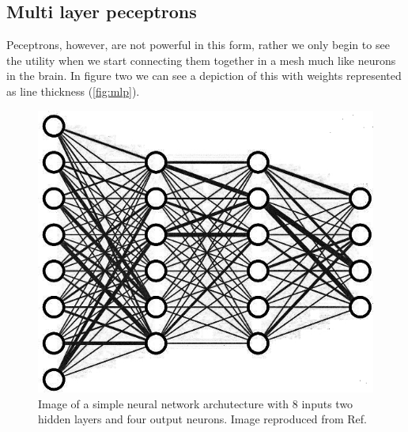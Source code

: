 \documentclass{article}
\begin{document}
\subsection{Multi layer peceptrons}
\label{sec:mlp}
Peceptrons, however, are not powerful in this form, rather we only begin to see the utility when we start connecting them together in a mesh much like neurons in the brain. In figure two we can see a depiction of this with weights represented as line thickness (\autoref{fig:mlp}).
\begin{figure}[H]
\caption{Image of a simple neural network archutecture with 8 inputs two hidden layers and four output neurons. Image reproduced from Ref.\cite{3blue1brown}}
\label{fig:mlp}
\includegraphics[scale=2]{nn.jpg}

\end{figure}
\end{document}
